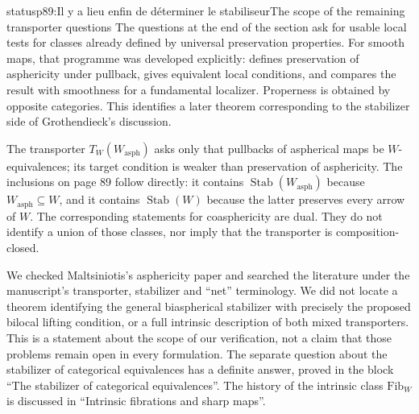 \begin{dcomment}{status}{p89:Il y a lieu enfin de déterminer le stabiliseur}{The scope of the remaining transporter questions}
The questions at the end of the section ask for usable local tests for classes already defined by universal preservation properties. For smooth maps, that programme was developed explicitly: \citet[Definition 4.6, Theorem 4.13, and Example 4.17]{Maltsiniotis2005Asphericite} defines preservation of asphericity under pullback, gives equivalent local conditions, and compares the result with smoothness for a fundamental localizer. Properness is obtained by opposite categories. This identifies a later theorem corresponding to the stabilizer side of Grothendieck's discussion.

The transporter $T_W(W_{\mathrm{asph}})$ asks only that pullbacks of aspherical maps be $W$-equivalences; its target condition is weaker than preservation of asphericity. The inclusions on page 89 follow directly: it contains $\operatorname{Stab}(W_{\mathrm{asph}})$ because $W_{\mathrm{asph}}\subseteq W$, and it contains $\operatorname{Stab}(W)$ because the latter preserves every arrow of $W$. The corresponding statements for coasphericity are dual. They do not identify a union of those classes, nor imply that the transporter is composition-closed.

We checked Maltsiniotis's asphericity paper and searched the literature under the manuscript's transporter, stabilizer and ``net'' terminology. We did not locate a theorem identifying the general biaspherical stabilizer with precisely the proposed bilocal lifting condition, or a full intrinsic description of both mixed transporters. This is a statement about the scope of our verification, not a claim that those problems remain open in every formulation. The separate question about the stabilizer of categorical equivalences has a definite answer, proved in the block ``The stabilizer of categorical equivalences''. The history of the intrinsic class $\mathrm{Fib}_W$ is discussed in ``Intrinsic fibrations and sharp maps''.
\end{dcomment}


